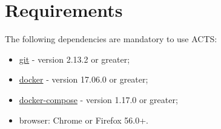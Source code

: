 \section{Requirements}\label{req}

The following dependencies are mandatory to use ACTS:
\begin{itemize}
   \item \href{https://git-scm.com/}{git} - version 2.13.2 or greater;
   \item \href{https://www.docker.com/get-docker}{docker} - version 17.06.0 or greater;
   \item \href{https://docs.docker.com/compose/install/}{docker-compose} - version 1.17.0 or greater;
   \item browser: Chrome or Firefox 56.0+.
\end{itemize}
